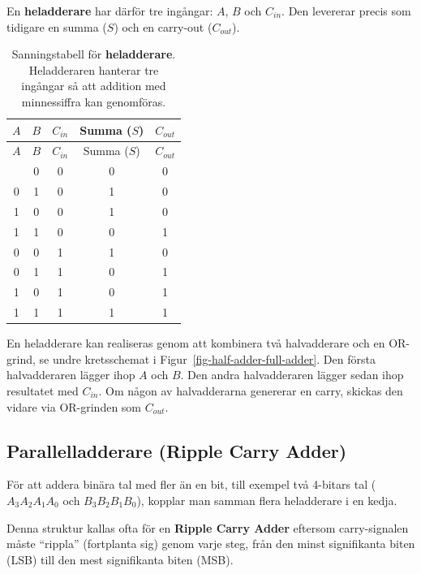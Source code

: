 \documentclass[
  swedish,
  letterpaper,
  oneside,
  openany]{book}
\begin{document}
En \textbf{heladderare} har därför tre ingångar: \(A\), \(B\) och
\(C_{in}\). Den levererar precis som tidigare en summa (\(S\)) och en
carry-out (\(C_{out}\)).

\begin{longtable}[]{@{}ccccc@{}}
\caption{Sanningstabell för \textbf{heladderare}. Heladderaren hanterar
tre ingångar så att addition med minnessiffra kan
genomföras.}\label{tbl-heladderare}\tabularnewline
\toprule\noalign{}
\(A\) & \(B\) & \(C_{in}\) & Summa (\(S\)) & \(C_{out}\) \\
\midrule\noalign{}
\endfirsthead
\toprule\noalign{}
\(A\) & \(B\) & \(C_{in}\) & Summa (\(S\)) & \(C_{out}\) \\
\midrule\noalign{}
\endhead
\bottomrule\noalign{}
\endlastfoot
0 & 0 & 0 & 0 & 0 \\
0 & 1 & 0 & 1 & 0 \\
1 & 0 & 0 & 1 & 0 \\
1 & 1 & 0 & 0 & 1 \\
0 & 0 & 1 & 1 & 0 \\
0 & 1 & 1 & 0 & 1 \\
1 & 0 & 1 & 0 & 1 \\
1 & 1 & 1 & 1 & 1 \\
\end{longtable}

En heladderare kan realiseras genom att kombinera två halvadderare och
en OR-grind, se undre kretsschemat i
Figur~\ref{fig-half-adder-full-adder}. Den första halvadderaren lägger
ihop \(A\) och \(B\). Den andra halvadderaren lägger sedan ihop
resultatet med \(C_{in}\). Om någon av halvadderarna genererar en carry,
skickas den vidare via OR-grinden som \(C_{out}\).

\subsection{Parallelladderare (Ripple Carry
Adder)}\label{sec-parallelladderaren}

För att addera binära tal med fler än en bit, till exempel två 4-bitars
tal (\(A_{3}A_{2}A_{1}A_{0}\) och \(B_{3}B_{2}B_{1}B_{0}\)), kopplar man
samman flera heladderare i en kedja.

Denna struktur kallas ofta för en \textbf{Ripple Carry Adder} eftersom
carry-signalen måste ``rippla'' (fortplanta sig) genom varje steg, från
den minst signifikanta biten (LSB) till den mest signifikanta biten
(MSB).
\end{document}
